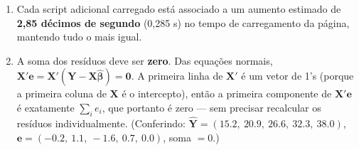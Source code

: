 \documentclass[11pt]{article}
\begin{document}
\begin{solucao}
\begin{enumerate}[label=(\alph*)]
  \item Cada script adicional carregado está associado a um aumento estimado de \textbf{2,85
    décimos de segundo} (0,285 s) no tempo de carregamento da página, mantendo tudo o mais igual.
  \item A soma dos resíduos deve ser \textbf{zero}. Das equações normais,
    $\mathbf{X}'\mathbf{e} = \mathbf{X}'(\mathbf{Y}-\mathbf{X}\hat{\boldsymbol\beta}) = \mathbf{0}$.
    A primeira linha de $\mathbf{X}'$ é um vetor de 1's (porque a primeira coluna de $\mathbf{X}$
    é o intercepto), então a primeira componente de $\mathbf{X}'\mathbf{e}$ é exatamente
    $\sum_i e_i$, que portanto é zero --- sem precisar recalcular os resíduos individualmente.
    (Conferindo: $\hat{\mathbf{Y}} = (15.2,\ 20.9,\ 26.6,\ 32.3,\ 38.0)$, $\mathbf{e} = (-0.2,\
    1.1,\ -1.6,\ 0.7,\ 0.0)$, soma $= 0$.)
\end{enumerate}
\end{solucao}
\end{document}
